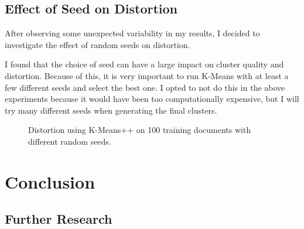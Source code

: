 \documentclass{article} %
\begin{document}
\subsection{Effect of Seed on Distortion}

After observing some unexpected variability in my results, I decided to investigate the effect of random seeds on distortion.

I found that the choice of seed can have a large impact on cluster quality and distortion. Because of this, it is very important to run K-Means with at least a few different seeds and select the best one. I opted to not do this in the above experiments because it would have been too computationally expensive, but I will try many different seeds when generating the final clusters.

\begin{figure}[h]
\begin{center}
\end{center}
\caption{Distortion using K-Means++ on 100 training documents with different random seeds.}
\end{figure}

\section{Conclusion}



\subsection{Further Research}
\end{document}
